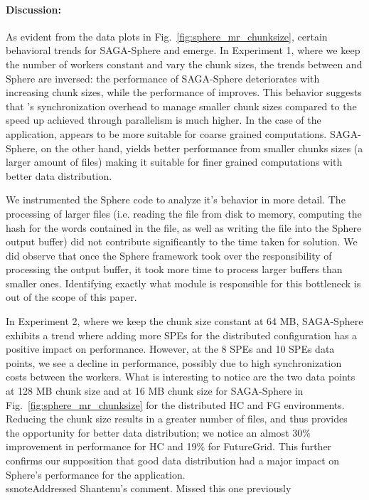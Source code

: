 \documentclass[3p,twocolumn]{elsarticle}
\begin{document}
\paragraph{Discussion:}
As evident from the data plots in Fig.~\ref{fig:sphere_mr_chunksize},
certain behavioral trends for SAGA-Sphere and \sagamapreduce emerge.
In Experiment 1, where we keep the number of workers constant and vary
the chunk sizes, the trends between \sagamapreduce and Sphere are
inversed: the performance of SAGA-Sphere deteriorates with increasing
chunk sizes, while the performance of \sagamapreduce improves. This
behavior suggests that \sagamapreduce's synchronization overhead to
manage smaller chunk sizes compared to the speed up achieved through
parallelism is much higher.  In the case of the \wc application,
\sagamapreduce appears to be more suitable for coarse grained
computations. SAGA-Sphere, on the other hand, yields better
performance from smaller chunks sizes (a larger amount of files)
making it suitable for finer grained computations with better data
distribution.

We instrumented the Sphere code to analyze it's behavior in more detail.
The processing of larger files (i.e. reading the file from disk to memory,
computing the hash for the words contained in the file, as
well as writing the file into the Sphere output buffer) did not
contribute significantly to the time taken for solution. We did
observe that once the Sphere framework took over the responsibility
of processing the output buffer, it took more time to process larger
buffers than smaller ones. Identifying exactly what module is
responsible for this bottleneck is out of the scope of this paper.

In Experiment 2, where we keep the chunk size constant at 64 MB,
SAGA-Sphere exhibits a trend where adding more SPEs for the distributed configuration has a positive
impact on performance. However, at the 8 SPEs and 10 SPEs data points,
we see a decline in performance, possibly due to high synchronization
costs between the workers.  What is interesting to notice are the two
data points at 128 MB chunk size and at 16 MB chunk size for
SAGA-Sphere in Fig.~\ref{fig:sphere_mr_chunksize} for the distributed HC and FG environments. Reducing the chunk
size results in a greater number of files, and thus provides
the opportunity for better data distribution; we notice an almost 30\%
improvement in performance for HC and 19\% for FutureGrid. This further confirms our supposition that
good data distribution had a major impact on Sphere's performance for
the \wc application. 
\\ssnote{Addressed Shantenu's comment. Missed this one previously}
\end{document}
